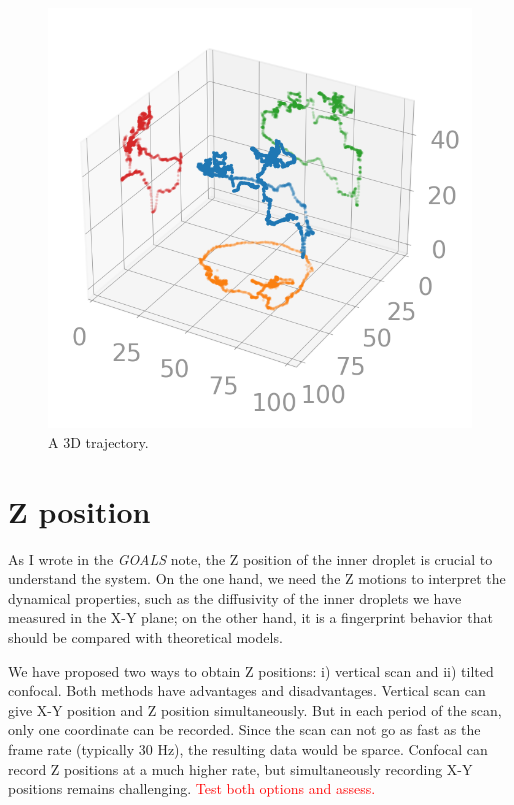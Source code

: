 \documentclass[onecolumn,aps, pre,amsmath,amssymb,longbibliography,11pt]{revtex4-2}
\begin{document}
\begin{figure}[h]
  \includegraphics{3d-traj.png}
  \caption{A 3D trajectory.}
  \label{fig:3d-traj}
\end{figure}




\section{Z position}
As I wrote in the \textit{GOALS} note, the Z position of the inner droplet is crucial to understand the system.
On the one hand, we need the Z motions to interpret the dynamical properties, such as the diffusivity of the inner droplets we have measured in the X-Y plane;
on the other hand, it is a fingerprint behavior that should be compared with theoretical models.

We have proposed two ways to obtain Z positions: i) vertical scan and ii) tilted confocal.
Both methods have advantages and disadvantages.
Vertical scan can give X-Y position and Z position simultaneously.
But in each period of the scan, only one coordinate can be recorded.
Since the scan can not go as fast as the frame rate (typically 30 Hz), the resulting data would be sparce.
Confocal can record Z positions at a much higher rate, but simultaneously recording X-Y positions remains challenging.
\textcolor{red}{Test both options and assess.}
\end{document}
